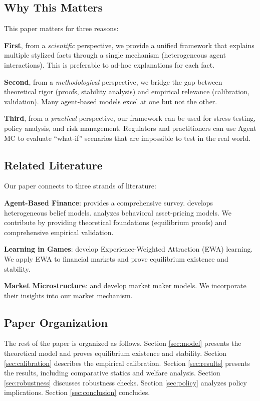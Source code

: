 \subsection{Why This Matters}

This paper matters for three reasons:

\textbf{First}, from a \textit{scientific} perspective, we provide a unified framework that explains multiple stylized facts through a single mechanism (heterogeneous agent interactions). This is preferable to ad-hoc explanations for each fact.

\textbf{Second}, from a \textit{methodological} perspective, we bridge the gap between theoretical rigor (proofs, stability analysis) and empirical relevance (calibration, validation). Many agent-based models excel at one but not the other.

\textbf{Third}, from a \textit{practical} perspective, our framework can be used for stress testing, policy analysis, and risk management. Regulators and practitioners can use Agent MC to evaluate ``what-if'' scenarios that are impossible to test in the real world.

\subsection{Related Literature}

Our paper connects to three strands of literature:

\textbf{Agent-Based Finance}: \citet{lebaron2006agent} provides a comprehensive survey. \citet{hommes2006heterogeneous} develops heterogeneous belief models. \citet{lux2009stochastic} analyzes behavioral asset-pricing models. We contribute by providing theoretical foundations (equilibrium proofs) and comprehensive empirical validation.

\textbf{Learning in Games}: \citet{camerer1999experience} develop Experience-Weighted Attraction (EWA) learning. We apply EWA to financial markets and prove equilibrium existence and stability.

\textbf{Market Microstructure}: \citet{glosten1985bid} and \citet{kyle1985continuous} develop market maker models. We incorporate their insights into our market mechanism.

\subsection{Paper Organization}

The rest of the paper is organized as follows. Section \ref{sec:model} presents the theoretical model and proves equilibrium existence and stability. Section \ref{sec:calibration} describes the empirical calibration. Section \ref{sec:results} presents the results, including comparative statics and welfare analysis. Section \ref{sec:robustness} discusses robustness checks. Section \ref{sec:policy} analyzes policy implications. Section \ref{sec:conclusion} concludes.

